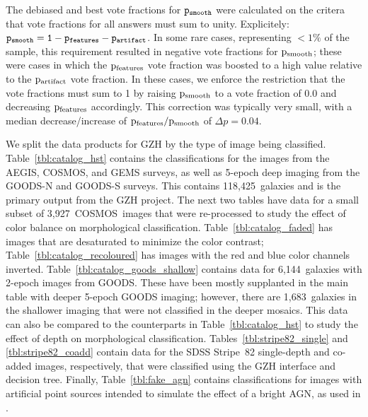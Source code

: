 \documentclass[usenatbib]{mn2e}
\begin{document}
The debiased and best vote fractions for $\tt p_{smooth}$ were calculated on the critera that vote fractions for all answers must sum to unity. Explicitely: $\tt p_{smooth} = 1 - p_{features} - p_{artifact}$. In some rare cases, representing  $<1\%$ of the sample, this requirement resulted in negative vote fractions for $\rm p_{smooth}$; these were cases in which the $\rm p_{features}$ vote fraction was boosted to a high value relative to the $\rm p_{artifact}$ vote fraction. In these cases, we enforce the restriction that the vote fractions must sum to 1 by raising $\rm p_{smooth}$ to a vote fraction of 0.0 and decreasing $\rm p_{features}$ accordingly. This correction was typically very small, with a median decrease/increase of $\rm p_{features}/p_{smooth}$ of $\Delta p = 0.04$.

We split the data products for GZH by the type of image being classified. Table~\ref{tbl:catalog_hst} contains the classifications for the \hst{} images from the AEGIS, COSMOS, and GEMS surveys, as well as 5-epoch deep imaging from the GOODS-N and GOODS-S surveys. This contains 118,425~galaxies and is the primary output from the GZH project. The next two tables have data for a small subset of 3,927~COSMOS~images that were re-processed to study the effect of color balance on morphological classification. Table~\ref{tbl:catalog_faded} has images that are desaturated to minimize the color contrast; Table~\ref{tbl:catalog_recoloured} has images with the red and blue color channels inverted. Table~\ref{tbl:catalog_goods_shallow} contains data for 6,144~galaxies with 2-epoch images from GOODS. These have been mostly supplanted in the main table with deeper 5-epoch GOODS imaging; however, there are 1,683~galaxies in the shallower imaging that were not classified in the deeper mosaics. This data can also be compared to the counterparts in Table~\ref{tbl:catalog_hst} to study the effect of depth on morphological classification. Tables~\ref{tbl:stripe82_single} and \ref{tbl:stripe82_coadd} contain data for the SDSS Stripe~82 single-depth and co-added images, respectively, that were classified using the GZH interface and decision tree. Finally, Table~\ref{tbl:fake_agn} contains classifications for images with artificial point sources intended to simulate the effect of a bright AGN, as used in \citet{sim14}.  
\end{document}
